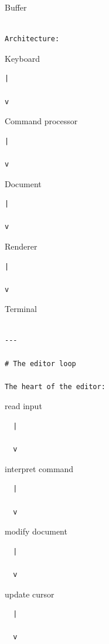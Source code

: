 \documentclass[
  oneside,
  openany]{book}
\begin{document}
Buffer

\begin{verbatim}

Architecture:
\end{verbatim}

Keyboard

\begin{verbatim}
|

v
\end{verbatim}

Command processor

\begin{verbatim}
|

v
\end{verbatim}

Document

\begin{verbatim}
|

v
\end{verbatim}

Renderer

\begin{verbatim}
|

v
\end{verbatim}

Terminal

\begin{verbatim}

---

# The editor loop

The heart of the editor:
\end{verbatim}

read input

\begin{verbatim}
  |

  v
\end{verbatim}

interpret command

\begin{verbatim}
  |

  v
\end{verbatim}

modify document

\begin{verbatim}
  |

  v
\end{verbatim}

update cursor

\begin{verbatim}
  |

  v
\end{verbatim}
\end{document}
